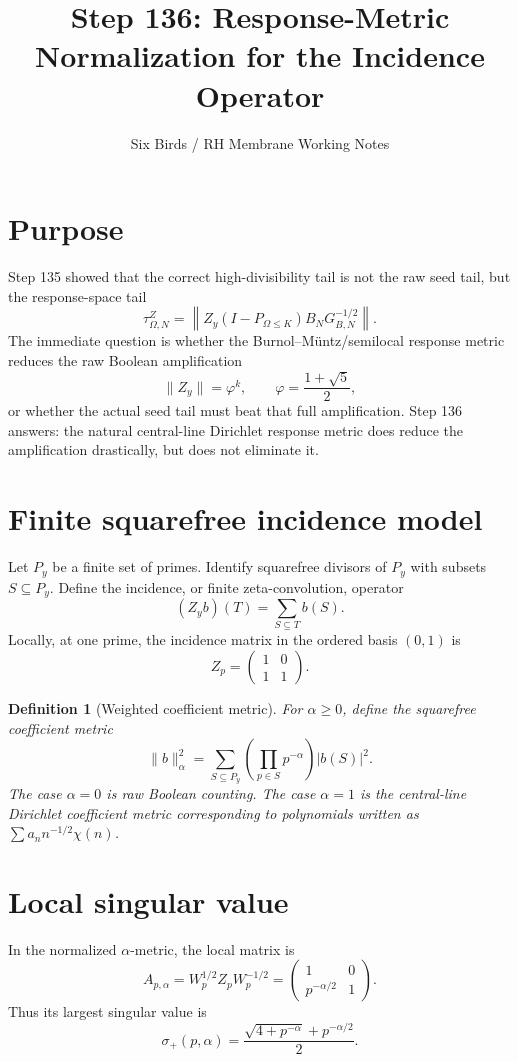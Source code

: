 \documentclass[11pt]{article}
\title{Step 136: Response-Metric Normalization for the Incidence Operator}
\author{Six Birds / RH Membrane Working Notes}
\date{}
\newtheorem{definition}{Definition}
\begin{document}
\maketitle

\section{Purpose}
Step 135 showed that the correct high-divisibility tail is not the raw seed tail, but the response-space tail
\[
\tau_{\Omega,N}^{Z}
=
\left\|Z_y(I-P_{\Omega\le K})B_NG_{B,N}^{-1/2}\right\| .
\]
The immediate question is whether the Burnol--Müntz/semilocal response metric reduces the raw Boolean amplification
\[
\|Z_y\|=\varphi^k,
\qquad \varphi=\frac{1+\sqrt5}{2},
\]
or whether the actual seed tail must beat that full amplification.  Step 136 answers: the natural central-line Dirichlet response metric does reduce the amplification drastically, but does not eliminate it.

\section{Finite squarefree incidence model}
Let $P_y$ be a finite set of primes.  Identify squarefree divisors of $P_y$ with subsets $S\subseteq P_y$.  Define the incidence, or finite zeta-convolution, operator
\[
(Z_yb)(T)=\sum_{S\subseteq T}b(S).
\]
Locally, at one prime, the incidence matrix in the ordered basis $(0,1)$ is
\[
Z_p=\begin{pmatrix}1&0\\1&1\end{pmatrix}.
\]

\begin{definition}[Weighted coefficient metric]
For $\alpha\ge0$, define the squarefree coefficient metric
\[
\|b\|_{\alpha}^{2}
=
\sum_{S\subseteq P_y}\left(\prod_{p\in S}p^{-\alpha}\right)|b(S)|^2.
\]
The case $\alpha=0$ is raw Boolean counting.  The case $\alpha=1$ is the central-line Dirichlet coefficient metric corresponding to polynomials written as $\sum a_n n^{-1/2}\chi(n)$.
\end{definition}

\section{Local singular value}
In the normalized $\alpha$-metric, the local matrix is
\[
A_{p,\alpha}=W_p^{1/2}Z_pW_p^{-1/2}
=
\begin{pmatrix}1&0\\p^{-\alpha/2}&1\end{pmatrix}.
\]
Thus its largest singular value is
\[
\sigma_+(p,\alpha)
=
\frac{\sqrt{4+p^{-\alpha}}+p^{-\alpha/2}}{2}.
\]
\end{document}
